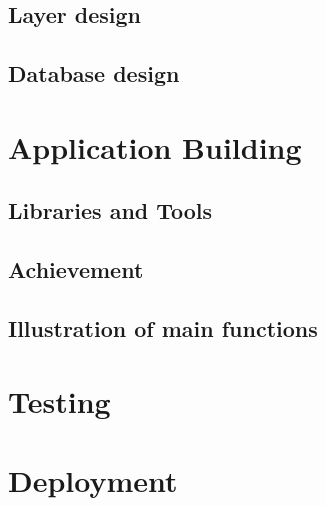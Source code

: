 \subsection{Layer design}

\subsection{Database design}

\section{Application Building}

\subsection{Libraries and Tools}

\subsection{Achievement}

\subsection{Illustration of main functions}

\section{Testing}

\section{Deployment}
